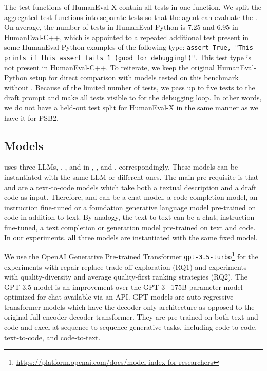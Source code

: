 The test functions of HumanEval-X contain all tests in one function. We split the aggregated test functions into separate tests so that the \rank{} agent can evaluate the . 
On average, the number of tests in HumanEval-Python is 7.25 and 6.95 in HumanEval-C++, which is appointed to a repeated additional test present in some HumanEval-Python examples of the following type: \texttt{assert True, "This prints if this assert fails 1 (good for debugging!)"}.
This test type is not present in HumanEval-C++.
To reiterate, we keep the original HumanEval-Python setup for direct comparison with models tested on this benchmark without \method{}. 
Because of the limited number of tests, we pass up to five tests to the draft prompt and make all tests visible to \method{} for the debugging loop. 
In other words, we do not have a held-out test split for HumanEval-X in the same manner as we have it for PSB2.


\newpage \subsection{Models}
\label{sec:models}

\method{} uses three LLMs, \synthmodel{}, \textmodel{}, and \debugmodel{} in \synthesize{}, \instruct{}, and \debug{}, correspondingly. 
These models can be instantiated with the same LLM or different ones. 
The main pre-requisite is that \synthmodel{} and \debug{} are a text-to-code models which take both a textual description and a draft code as input.
Therefore, \synthmodel{} and \debug{} can be a chat model, a code completion model, an instruction fine-tuned or a foundation generative language model pre-trained on code in addition to text. 
By analogy, the text-to-text \textmodel{} can be a chat, instruction fine-tuned, a text completion or generation model pre-trained on text and code.
In our experiments, all three models are instantiated with the same fixed model. 

We use the OpenAI Generative Pre-trained Transformer \texttt{gpt-3.5-turbo}\footnote{\url{https://platform.openai.com/docs/model-index-for-researchers}}  for the experiments with repair-replace trade-off exploration (RQ1) and experiments with quality-diversity and average quality-first ranking strategies (RQ2). 
The GPT-3.5 model is an improvement over the GPT-3~\cite{brown2020:language} 175B-parameter model optimized for chat available via an API.
GPT models are auto-regressive transformer models which have the decoder-only architecture as opposed to the original full encoder-decoder transformer.
They are pre-trained on both text and code and excel at sequence-to-sequence generative tasks, including code-to-code, text-to-code, and code-to-text.


